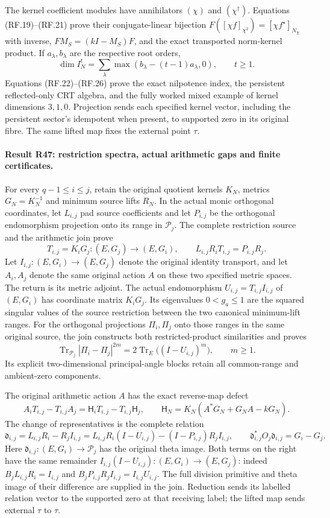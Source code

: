 The kernel coefficient modules have annihilators $(\chi)$ and
$(\chi^\dagger)$. Equations (RF.19)--(RF.21) prove their
conjugate-linear bijection
$F([\chi f]_{\chi^2})=[\chi f^\star]_{N_\chi}$ with inverse,
$FM_S=(kI-M_S)F$, and the exact transported norm-kernel product.
If $a_\lambda,b_\lambda$ are the respective root orders,
\[
 \dim I_N^t=\sum_\lambda
            \max(b_\lambda-(t-1)a_\lambda,0),\qquad t\ge1.
\]
Equations (RF.22)--(RF.26) prove the exact nilpotence index, the
persistent reflected-only CRT algebra, and the fully worked mixed
example of kernel dimensions $3,1,0$. Projection sends each
specified kernel vector, including the persistent sector's
idempotent when present, to supported zero in its original fibre.
The same lifted map fixes the external point $\tau$.



\paragraph{Result R47: restriction spectra, actual arithmetic gaps and finite certificates.}
For every $q-1\le i\le j$, retain the original quotient kernels
$K_N$, metrics $G_N=K_N^{-1}$ and minimum source lifts $R_N$.
In the actual monic orthogonal coordinates, let $L_{i,j}$ pad source
coefficients and let $P_{i,j}$ be the orthogonal endomorphism
projection onto its range in $\mathcal P_j$. The complete
restriction source and the arithmetic join prove
\[
 T_{i,j}=K_iG_j:(E,G_j)\longrightarrow(E,G_i),\qquad
 L_{i,j}R_iT_{i,j}=P_{i,j}R_j.
\]
Let $I_{i,j}:(E,G_i)\to(E,G_j)$ denote the original identity
transport, and let $A_i,A_j$ denote the same original action $A$
on these two specified metric spaces. The return is its metric
adjoint. The actual endomorphism
$U_{i,j}=T_{i,j}I_{i,j}$ of $(E,G_i)$ has coordinate matrix
$K_iG_j$. Its eigenvalues $0<g_a\le1$
are the squared singular values of the source restriction between
the two canonical minimum-lift ranges. For the orthogonal projections
$\Pi_i,\Pi_j$ onto those ranges in the same original source, the
join constructs both restricted-product similarities and proves
\[
 \operatorname{Tr}_{\mathcal P_j}|\Pi_i-\Pi_j|^{2m}
   =2\operatorname{Tr}_E\bigl((I-U_{i,j})^m\bigr),
 \qquad m\ge1.
\]
Its explicit two-dimensional principal-angle blocks retain all
common-range and ambient-zero components.

The original arithmetic action $A$ has the exact reverse-map defect
\[
 A_iT_{i,j}-T_{i,j}A_j
  =\mathsf H_iT_{i,j}-T_{i,j}\mathsf H_j,
 \qquad
 \mathsf H_N=K_N(A^*G_N+G_NA-kG_N).
\]
The change of representatives is the complete relation
\[
 \mathfrak d_{i,j}=L_{i,j}R_i-R_jI_{i,j}
   =L_{i,j}R_i(I-U_{i,j})-(I-P_{i,j})R_jI_{i,j},
 \qquad
 \mathfrak d_{i,j}^*O_j\mathfrak d_{i,j}=G_i-G_j.
\]
Here $\mathfrak d_{i,j}:(E,G_i)\to\mathcal P_j$ has the
original theta image. Both terms on the right have the same
remainder $I_{i,j}(I-U_{i,j}):(E,G_i)\to(E,G_j)$:
indeed $B_jL_{i,j}R_i=I_{i,j}$ and
$B_jP_{i,j}R_jI_{i,j}=I_{i,j}U_{i,j}$. The full division primitive and theta image of their
difference are supplied in the join. Reduction sends its labelled
relation vector to the supported zero at that receiving label;
the lifted map sends external $\tau$ to $\tau$.

